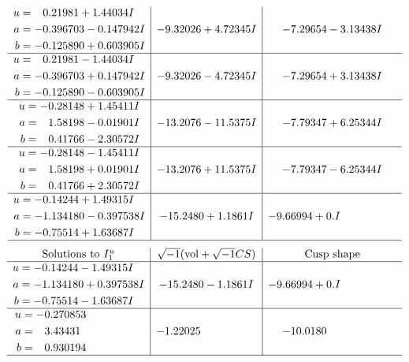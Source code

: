 \documentclass[1p]{elsarticle_modified}
\theoremstyle{definition}
\newcommand{\I}{\sqrt{-1}}
\begin{document}
$$\begin{array}{c|c|c}
\begin{aligned}
u &= \phantom{-}0.21981 + 1.44034 I \\
a &= -0.396703 - 0.147942 I \\
b &= -0.125890 + 0.603905 I\end{aligned}
 & -9.32026 + 4.72345 I & -7.29654 - 3.13438 I \\ \hline\begin{aligned}
u &= \phantom{-}0.21981 - 1.44034 I \\
a &= -0.396703 + 0.147942 I \\
b &= -0.125890 - 0.603905 I\end{aligned}
 & -9.32026 - 4.72345 I & -7.29654 + 3.13438 I \\ \hline\begin{aligned}
u &= -0.28148 + 1.45411 I \\
a &= \phantom{-}1.58198 - 0.01901 I \\
b &= \phantom{-}0.41766 - 2.30572 I\end{aligned}
 & -13.2076 - 11.5375 I & -7.79347 + 6.25344 I \\ \hline\begin{aligned}
u &= -0.28148 - 1.45411 I \\
a &= \phantom{-}1.58198 + 0.01901 I \\
b &= \phantom{-}0.41766 + 2.30572 I\end{aligned}
 & -13.2076 + 11.5375 I & -7.79347 - 6.25344 I \\ \hline\begin{aligned}
u &= -0.14244 + 1.49315 I \\
a &= -1.134180 - 0.397538 I \\
b &= -0.75514 + 1.63687 I\end{aligned}
 & -15.2480 + 1.1861 I & -9.66994 + 0. I\phantom{ +0.000000I}\\
 \hline 
 \end{array}$$\newpage$$\begin{array}{c|c|c}  
\text{Solutions to }I^u_{1}& \I (\text{vol} + \sqrt{-1}CS) & \text{Cusp shape}\\
 \hline 
\begin{aligned}
u &= -0.14244 - 1.49315 I \\
a &= -1.134180 + 0.397538 I \\
b &= -0.75514 - 1.63687 I\end{aligned}
 & -15.2480 - 1.1861 I & -9.66994 + 0. I\phantom{ +0.000000I} \\ \hline\begin{aligned}
u &= -0.270853\phantom{ +0.000000I} \\
a &= \phantom{-}3.43431\phantom{ +0.000000I} \\
b &= \phantom{-}0.930194\phantom{ +0.000000I}\end{aligned}
 & -1.22025\phantom{ +0.000000I} & -10.0180\phantom{ +0.000000I}\\
 \hline 
 \end{array}$$\newpage\newpage\renewcommand{\arraystretch}{1}
\end{document}
